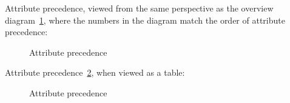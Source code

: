 Attribute precedence, viewed from the same perspective as the overview diagram~\ref{fig:overview_chef_attributes_precedence}, where the numbers in the diagram match the order of attribute precedence:

\begin{figure}[ht!]
  \caption{Attribute precedence}
  \label{fig:overview_chef_attributes_precedence}
\end{figure}

Attribute precedence~\ref{fig:overview_chef_attributes_table}, when viewed as a table:

\begin{figure}[ht!]
  \caption{Attribute precedence}
  \label{fig:overview_chef_attributes_table}
\end{figure}
